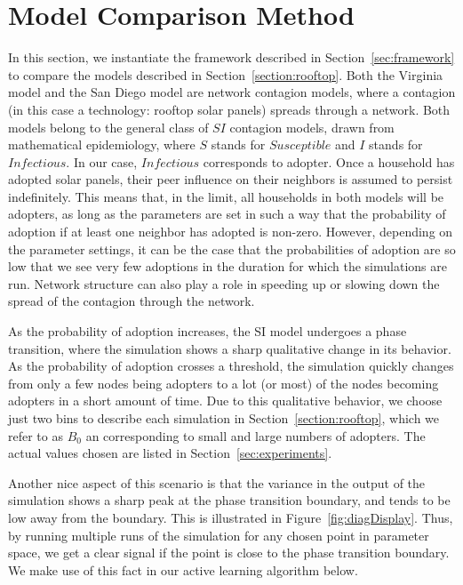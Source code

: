 \section{Model Comparison Method}
\label{sec:learning}


In this section, we instantiate the framework described in Section~\ref{sec:framework} to compare the models described in Section~\ref{section:rooftop}. 
Both the Virginia model and the San Diego model are network contagion models,
where a contagion (in this case a technology: rooftop solar panels) spreads through a network. Both models belong to the general class of $SI$ contagion models,
drawn from mathematical epidemiology, where $S$ stands for $Susceptible$
and $I$ stands for $Infectious$. In our case, $Infectious$ corresponds to adopter. Once a household has adopted solar panels, their peer influence on their neighbors is assumed to persist indefinitely.
This means that, in the limit, all households in both models will be adopters, as
long as the parameters are set in such a way that the probability of adoption if at
least one neighbor has adopted is non-zero. However, depending on the parameter
settings, it can be the case that the probabilities of adoption are so low that 
we see very few adoptions in the duration for which the simulations are run. Network
structure can also play a role in speeding up or slowing down the spread of the 
contagion through the network.

As the probability of adoption increases, the SI model undergoes a phase transition,
where the simulation shows a sharp qualitative change in its behavior. As the probability of adoption crosses a threshold, the simulation quickly changes from only a few nodes being adopters to a lot (or most) of the nodes becoming adopters in a short amount of time. Due to this qualitative behavior, we choose just two bins to describe each simulation in Section~\ref{section:rooftop}, which we refer to as $B_0$ an corresponding to small and large numbers of adopters. The actual values chosen are listed in Section~\ref{sec:experiments}.

Another nice aspect of this scenario is that the variance in the output of the 
simulation shows a sharp peak at the phase transition boundary, and tends to be low
away from the boundary. This is illustrated in Figure~\ref{fig:diagDisplay}. Thus, by running multiple runs of the simulation for any 
chosen point in parameter space, we get a clear signal if the point is close to the phase transition boundary. We make use of this fact in our active learning algorithm below.

